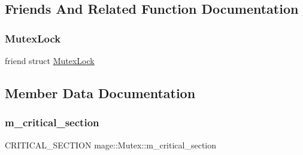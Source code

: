 \subsection{Friends And Related Function Documentation}
\hypertarget{classmage_1_1_mutex_a058473d070063e5098732f355f432bd9}{}\label{classmage_1_1_mutex_a058473d070063e5098732f355f432bd9} 
\subsubsection{\texorpdfstring{Mutex\+Lock}{MutexLock}}
{\footnotesize\ttfamily friend struct \hyperlink{structmage_1_1_mutex_lock}{Mutex\+Lock}\hspace{0.3cm}{\ttfamily [friend]}}



\subsection{Member Data Documentation}
\hypertarget{classmage_1_1_mutex_a18414337aef28b7ed261e7a805d2c103}{}\label{classmage_1_1_mutex_a18414337aef28b7ed261e7a805d2c103} 
\subsubsection{\texorpdfstring{m\+\_\+critical\+\_\+section}{m\_critical\_section}}
{\footnotesize\ttfamily C\+R\+I\+T\+I\+C\+A\+L\+\_\+\+S\+E\+C\+T\+I\+ON mage\+::\+Mutex\+::m\+\_\+critical\+\_\+section\hspace{0.3cm}{\ttfamily [private]}}

